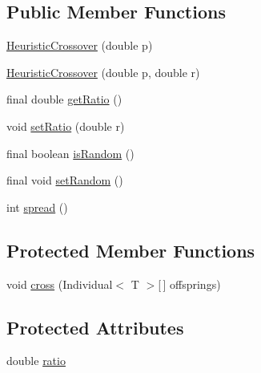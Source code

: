 \subsection*{Public Member Functions}
\begin{DoxyCompactItemize}
\item 
\hyperlink{classjenes_1_1stage_1_1operator_1_1common_1_1_heuristic_crossover_3_01_t_01extends_01_double_chromosome_01_4_ab1d3d3ec4281a97824e9859fddfba792}{Heuristic\-Crossover} (double p)
\item 
\hyperlink{classjenes_1_1stage_1_1operator_1_1common_1_1_heuristic_crossover_3_01_t_01extends_01_double_chromosome_01_4_a45df3b701ffb650f013d3b65753f4ffa}{Heuristic\-Crossover} (double p, double r)
\item 
final double \hyperlink{classjenes_1_1stage_1_1operator_1_1common_1_1_heuristic_crossover_3_01_t_01extends_01_double_chromosome_01_4_acab7758424b5132b15579fff5da094d5}{get\-Ratio} ()
\item 
void \hyperlink{classjenes_1_1stage_1_1operator_1_1common_1_1_heuristic_crossover_3_01_t_01extends_01_double_chromosome_01_4_adec77409f57afee4170cacb806e7254c}{set\-Ratio} (double r)
\item 
final boolean \hyperlink{classjenes_1_1stage_1_1operator_1_1common_1_1_heuristic_crossover_3_01_t_01extends_01_double_chromosome_01_4_ab965521456ce0233197659c9eb7f0e16}{is\-Random} ()
\item 
final void \hyperlink{classjenes_1_1stage_1_1operator_1_1common_1_1_heuristic_crossover_3_01_t_01extends_01_double_chromosome_01_4_ad3c86ba10d567679be7750185c955ef2}{set\-Random} ()
\item 
int \hyperlink{classjenes_1_1stage_1_1operator_1_1common_1_1_heuristic_crossover_3_01_t_01extends_01_double_chromosome_01_4_aa2443a20ee35492f91c021f0b369354d}{spread} ()
\end{DoxyCompactItemize}
\subsection*{Protected Member Functions}
\begin{DoxyCompactItemize}
\item 
void \hyperlink{classjenes_1_1stage_1_1operator_1_1common_1_1_heuristic_crossover_3_01_t_01extends_01_double_chromosome_01_4_aeb3cbe441f2588644e5129d7501c90ed}{cross} (Individual$<$ T $>$\mbox{[}$\,$\mbox{]} offsprings)
\end{DoxyCompactItemize}
\subsection*{Protected Attributes}
\begin{DoxyCompactItemize}
\item 
double \hyperlink{classjenes_1_1stage_1_1operator_1_1common_1_1_heuristic_crossover_3_01_t_01extends_01_double_chromosome_01_4_a9cae7cf20e3154743a4dbe53054f513b}{ratio}
\end{DoxyCompactItemize}


